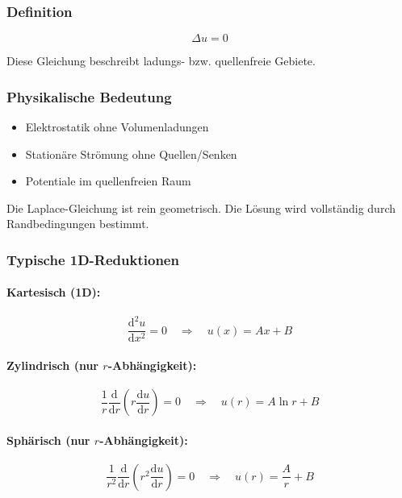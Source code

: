 \documentclass[a4paper]{article}
\renewcommand{\dd}{\mathrm{d}}
\begin{document}
\subsubsection{Definition}

\[
\Delta u = 0
\]

Diese Gleichung beschreibt ladungs- bzw. quellenfreie Gebiete.

\subsubsection{Physikalische Bedeutung}

\begin{itemize}
  \item Elektrostatik ohne Volumenladungen
  \item Stationäre Strömung ohne Quellen/Senken
  \item Potentiale im quellenfreien Raum
\end{itemize}

\begin{merke}
Die Laplace-Gleichung ist rein geometrisch.
Die Lösung wird vollständig durch Randbedingungen bestimmt.
\end{merke}

\subsubsection{Typische 1D-Reduktionen}

\paragraph{Kartesisch (1D):}
\[
\frac{\dd^2 u}{\dd x^2} = 0
\quad \Rightarrow \quad
u(x) = Ax + B
\]

\paragraph{Zylindrisch (nur $r$-Abhängigkeit):}
\[
\frac{1}{r}\frac{\dd}{\dd r}
\left(r\frac{\dd u}{\dd r}\right)=0
\quad \Rightarrow \quad
u(r)=A\ln r + B
\]

\paragraph{Sphärisch (nur $r$-Abhängigkeit):}
\[
\frac{1}{r^2}\frac{\dd}{\dd r}
\left(r^2\frac{\dd u}{\dd r}\right)=0
\quad \Rightarrow \quad
u(r)=\frac{A}{r}+B
\]
\end{document}
